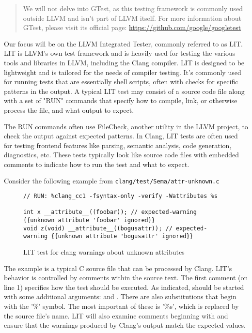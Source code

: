 \begin{quote}
We will not delve into GTest, as this testing framework is commonly used outside
LLVM and isn't part of LLVM itself. For more information about GTest, please
visit its official page:
\href{https://github.com/google/googletest}{https://github.com/google/googletest}
\end{quote}

Our focus will be on the LLVM Integrated Tester, commonly referred to as
LIT. LIT is LLVM's own test framework and is heavily used for testing the
various tools and libraries in LLVM, including the Clang compiler. LIT is
designed to be lightweight and is tailored for the needs of compiler
testing. It's commonly used for running tests that are essentially shell
scripts, often with checks for specific patterns in the output. A typical LIT
test may consist of a source code file along with a set of "RUN" commands that
specify how to compile, link, or otherwise process the file, and what output to
expect.

The RUN commands often use FileCheck, another utility in the LLVM project, to
check the output against expected patterns. In Clang, LIT tests are often used
for testing frontend features like parsing, semantic analysis, code generation,
diagnostics, etc. These tests typically look like source code files with
embedded comments to indicate how to run the test and what to expect.

Consider the following example from
\texttt{clang/test/Sema/attr-unknown.c}
\begin{figure}[H]
\begin{verbatim}
// RUN: %clang_cc1 -fsyntax-only -verify -Wattributes %s

int x __attribute__((foobar)); // expected-warning {{unknown attribute 'foobar' ignored}}
void z(void) __attribute__((bogusattr)); // expected-warning {{unknown attribute 'bogusattr' ignored}}
\end{verbatim}
\caption{LIT test for clang warnings about unknown attributes}
\label{lis:ch4:lit_test_attr_unknown}
\end{figure}
The example is a typical C source file that can be processed by Clang. LIT's 
behavior is controlled by comments within the source text. The first comment (on 
line 1) specifies how the test should be executed. As indicated,  
should be started with some additional arguments:  and 
. There are also substitutions that begin with the '\%' symbol. 
The most important of these is '\%s', which is replaced by the source file's
name.  
LIT will also examine comments beginning with  and 
ensure that the warnings produced by Clang's output match the expected values.

